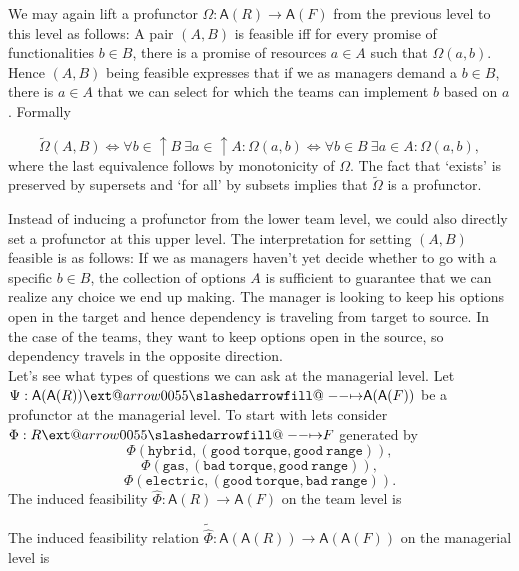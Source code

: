 \documentclass[12pt]{article}
\makeatletter
\theoremstyle{definition}
\theoremstyle{plain}
\theoremstyle{plain}
\theoremstyle{plain}
\theoremstyle{plain}
\theoremstyle{remark}
\theoremstyle{remark}
\newcommand{\ac}{\mathsf{A}}
\def\slashedarrowfill@#1#2#3#4#5{%
	$\m@th\thickmuskip0mu\medmuskip\thickmuskip\thinmuskip\thickmuskip
	\relax#5#1\mkern-7mu%
	\cleaders\hbox{$#5\mkern-2mu#2\mkern-2mu$}\hfill
	\mathclap{#3}\mathclap{#2}%
	\cleaders\hbox{$#5\mkern-2mu#2\mkern-2mu$}\hfill
	\mkern-7mu#4$%
}
\def\rightslashedarrowfill@{%
	\slashedarrowfill@\relbar\relbar\mapstochar\rightarrow}
\newcommand\xslashedrightarrow[2][]{%
	\ext@arrow 0055{\rightslashedarrowfill@}{#1}{#2}}
\makeatother
\begin{document}
We may again lift a profunctor $\Omega: \ac(R) \rightarrow \ac(F)$ from the previous level to this level as follows: A pair $(A,B)$ is feasible iff for every promise of functionalities $b \in B$, there is a promise of resources $a \in A$ such that $\Omega(a,b)$. Hence $(A,B)$ being feasible expresses that if we as managers demand a $b \in B$, there is $a \in A$ that we can select for which the teams can implement $b$ based on $a$. Formally

$$\tilde\Omega(A,B) \iff \forall b \in \uparrow B \: \exists a \in  \uparrow A: \Omega(a,b) \iff \forall b \in B\: \exists a \in  A: \Omega(a,b),$$
where the last equivalence follows by monotonicity of $\Omega$. The fact that `exists' is preserved by supersets and `for all' by subsets implies that $\tilde\Omega$ is a profunctor. 

Instead of inducing a profunctor from the lower team level, we could also directly set a profunctor at this upper level. The interpretation for setting $(A,B)$ feasible is as follows: If we as managers haven't yet decide whether to go with a specific $b \in B$, the collection of options $A$ is sufficient to guarantee that we can realize any choice we end up making. The manager is looking to keep his options open in the target and hence dependency is traveling from target to source. In the case of the teams, they want to keep options open in the source, so dependency travels in the opposite direction.\\

Let's see what types of questions we can ask at the managerial level. Let $\Psi: \ac(\ac(R)) \xslashedrightarrow{} \ac(\ac(F))$ be a profunctor at the managerial level. To start with lets consider $\Phi: R \xslashedrightarrow{} F$ generated by 
$$\Phi(\mathtt{hybrid},\mathtt{(good\ torque, good\ range)}),$$
$$\Phi(\mathtt{gas},\mathtt{(bad\ torque, good\ range)}),$$
$$\Phi(\mathtt{electric},\mathtt{(good\ torque, bad\ range)}).$$
The induced feasibility $\hat\Phi: \ac(R) \rightarrow \ac(F)$ on the team level is


The induced feasibility relation $\tilde\hat\Phi: \ac(\ac(R)) \rightarrow \ac(\ac(F))$ on the managerial level is



\newpage
\printbibliography
\end{document}
